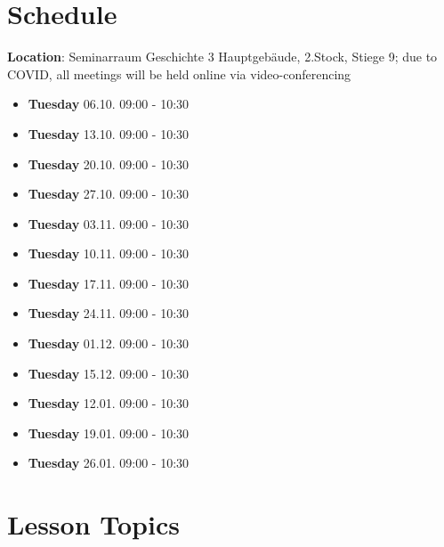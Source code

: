 \documentclass[
]{book}
\providecommand{\tightlist}{%
  \setlength{\itemsep}{0pt}\setlength{\parskip}{0pt}}
\begin{document}
\hypertarget{schedule}{%
\section*{Schedule}\label{schedule}}

\textbf{Location}: Seminarraum Geschichte 3 Hauptgebäude, 2.Stock, Stiege 9; due to COVID, all meetings will be held online via video-conferencing

\begin{itemize}
\tightlist
\item
  \textbf{Tuesday} 06.10. 09:00 - 10:30
\item
  \textbf{Tuesday} 13.10. 09:00 - 10:30
\item
  \textbf{Tuesday} 20.10. 09:00 - 10:30
\item
  \textbf{Tuesday} 27.10. 09:00 - 10:30
\item
  \textbf{Tuesday} 03.11. 09:00 - 10:30
\item
  \textbf{Tuesday} 10.11. 09:00 - 10:30
\item
  \textbf{Tuesday} 17.11. 09:00 - 10:30
\item
  \textbf{Tuesday} 24.11. 09:00 - 10:30
\item
  \textbf{Tuesday} 01.12. 09:00 - 10:30
\item
  \textbf{Tuesday} 15.12. 09:00 - 10:30
\item
  \textbf{Tuesday} 12.01. 09:00 - 10:30
\item
  \textbf{Tuesday} 19.01. 09:00 - 10:30
\item
  \textbf{Tuesday} 26.01. 09:00 - 10:30
\end{itemize}

\hypertarget{lesson-topics}{%
\section*{Lesson Topics}\label{lesson-topics}}
\end{document}
